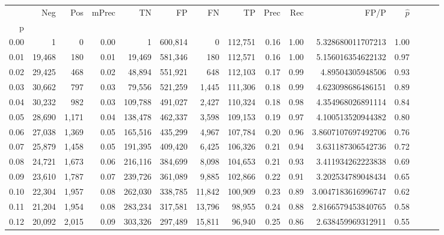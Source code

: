 \begin{tabular}{rrrrrrrrrrrrrrr}
\toprule
{} &     Neg &    Pos & mPrec &       TN &       FP &       FN &       TP &  Prec &   Rec &                    FP/P & $\hat{p}$ \\
p    &         &        &       &          &          &          &          &       &       &                         &           \\
\midrule
0.00 &       1 &      0 &  0.00 &        1 &  600,814 &        0 &  112,751 &  0.16 &  1.00 &       5.328680011707213 &      1.00 \\
0.01 &  19,468 &    180 &  0.01 &   19,469 &  581,346 &      180 &  112,571 &  0.16 &  1.00 &       5.156016354622132 &      0.97 \\
0.02 &  29,425 &    468 &  0.02 &   48,894 &  551,921 &      648 &  112,103 &  0.17 &  0.99 &        4.89504305948506 &      0.93 \\
0.03 &  30,662 &    797 &  0.03 &   79,556 &  521,259 &    1,445 &  111,306 &  0.18 &  0.99 &       4.623098686486151 &      0.89 \\
0.04 &  30,232 &    982 &  0.03 &  109,788 &  491,027 &    2,427 &  110,324 &  0.18 &  0.98 &       4.354968026891114 &      0.84 \\
0.05 &  28,690 &  1,171 &  0.04 &  138,478 &  462,337 &    3,598 &  109,153 &  0.19 &  0.97 &       4.100513520944382 &      0.80 \\
0.06 &  27,038 &  1,369 &  0.05 &  165,516 &  435,299 &    4,967 &  107,784 &  0.20 &  0.96 &      3.8607107697492706 &      0.76 \\
0.07 &  25,879 &  1,458 &  0.05 &  191,395 &  409,420 &    6,425 &  106,326 &  0.21 &  0.94 &       3.631187306542736 &      0.72 \\
0.08 &  24,721 &  1,673 &  0.06 &  216,116 &  384,699 &    8,098 &  104,653 &  0.21 &  0.93 &       3.411934262223838 &      0.69 \\
0.09 &  23,610 &  1,787 &  0.07 &  239,726 &  361,089 &    9,885 &  102,866 &  0.22 &  0.91 &       3.202534789048434 &      0.65 \\
0.10 &  22,304 &  1,957 &  0.08 &  262,030 &  338,785 &   11,842 &  100,909 &  0.23 &  0.89 &      3.0047183616996747 &      0.62 \\
0.11 &  21,204 &  1,954 &  0.08 &  283,234 &  317,581 &   13,796 &   98,955 &  0.24 &  0.88 &      2.8166579453840765 &      0.58 \\
0.12 &  20,092 &  2,015 &  0.09 &  303,326 &  297,489 &   15,811 &   96,940 &  0.25 &  0.86 &       2.638459969312911 &      0.55 \\

\end{tabular}
